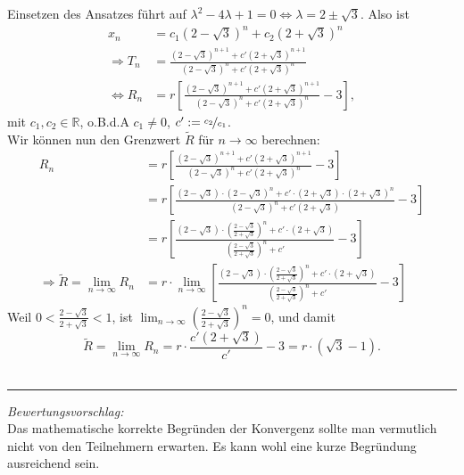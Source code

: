 \documentclass[a4paper]{article}
\numberwithin{equation}{Exercise}
\numberwithin{figure}{Exercise}
\begin{document}
\begin{Answer}[ref = recres]
	Einsetzen des Ansatzes führt auf $\lambda^2 - 4 \lambda + 1 = 0 \Leftrightarrow \lambda = 2\pm \sqrt{3}$. Also ist 
	\begin{align*}
	x_n &= c_1 \left(2-\sqrt{3}\right)^n + c_2 \left(2+\sqrt{3}\right)^n\\
	\Rightarrow T_n &= \frac{\left(2-\sqrt{3}\right)^{n+1} + c'\left(2+\sqrt{3}\right)^{n+1}}{\left(2-\sqrt{3}\right)^{n} + c'\left(2+\sqrt{3}\right)^{n}}\\
	\Leftrightarrow R_n &= r\left[\frac{\left(2-\sqrt{3}\right)^{n+1} + c'\left(2+\sqrt{3}\right)^{n+1}}{\left(2-\sqrt{3}\right)^{n} + c'\left(2+\sqrt{3}\right)^{n}}-3\right],
	\end{align*}
	mit $c_1,c_2\in \mathbb{R}$, o.B.d.A $c_1\neq 0$, $c':= \nicefrac{c_2}{c_1}$.\\
	Wir können nun den Grenzwert $\tilde{R}$ für $n\to\infty$ berechnen:
	\begin{align*}
	R_{n} &= r\left[\frac{\left(2-\sqrt{3}\right)^{n+1} + c'\left(2+\sqrt{3}\right)^{n+1}}{\left(2-\sqrt{3}\right)^{n} + c'\left(2+\sqrt{3}\right)^{n}}-3\right]\\
	&= r\left[\frac{\left(2-\sqrt{3}\right) \cdot \left(2-\sqrt{3}\right)^n + c'\cdot \left(2+\sqrt{3}\right)\cdot \left(2+\sqrt{3}\right)^n}{\left(2-\sqrt{3}\right)^n + c' \left(2+\sqrt{3}\right)}-3\right]\\
	&= r\left[\frac{\left(2-\sqrt{3}\right) \cdot \left(\frac{2-\sqrt{3}}{2+\sqrt{3}}\right)^n + c'\cdot \left(2+\sqrt{3}\right)}{\left(\frac{2-\sqrt{3}}{2+\sqrt{3}}\right)^n + c' }-3\right]\\
	\Rightarrow \tilde{R} =  \lim_{n\to \infty} R_n &= r\cdot \lim_{n\to \infty}\left[\frac{\left(2-\sqrt{3}\right) \cdot \left(\frac{2-\sqrt{3}}{2+\sqrt{3}}\right)^n + c'\cdot \left(2+\sqrt{3}\right)}{\left(\frac{2-\sqrt{3}}{2+\sqrt{3}}\right)^n + c' }-3\right]
	\end{align*}
	Weil $0<\frac{2-\sqrt{3}}{2+\sqrt{3}}<1$, ist $\lim_{n\to \infty}\left(\frac{2-\sqrt{3}}{2+\sqrt{3}}\right)^n = 0$, und damit
	\begin{equation*}
	\boxed{
		\tilde{R} = \lim_{n \to \infty} R_n = r\cdot \frac{c'\left(2+\sqrt{3}\right)}{c'} - 3 = r\cdot \left( \sqrt{3}-1\right).
	}
	\end{equation*}
	\\
	\noindent\rule{\textwidth}{.75pt}
	\textit{Bewertungsvorschlag:}\\
	Das mathematische korrekte Begründen der Konvergenz sollte man vermutlich nicht von den Teilnehmern erwarten. Es kann wohl eine kurze Begründung ausreichend sein.\\

\end{Answer}
\end{document}
